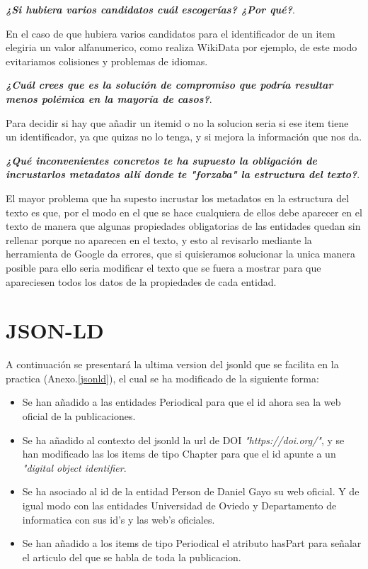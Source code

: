 \documentclass[spanish]{llncs}   %
\begin{document}
\textbf{\textit{¿Si hubiera varios candidatos cuál escogerías? ¿Por qué?}}.

En el caso de que hubiera varios candidatos para el identificador de un item elegiria un valor alfanumerico, como 
realiza WikiData por ejemplo, de este modo evitariamos colisiones y problemas de idiomas.

\textbf{\textit{¿Cuál crees que es la solución de compromiso que podría resultar menos polémica en la mayoría de casos?}}.

Para decidir si hay que añadir un itemid o no la solucion seria si ese item tiene un identificador, ya que quizas no lo tenga,
y si mejora la información que nos da.

\textbf{\textit{¿Qué inconvenientes concretos te ha supuesto la obligación de incrustarlos metadatos allí donde te "forzaba" 
la estructura del texto?}}.

El mayor problema que ha supesto incrustar los metadatos en la estructura del texto es que, por el modo 
en el que se hace cualquiera de ellos debe aparecer en el texto de manera que algunas propiedades obligatorias de las entidades
quedan sin rellenar porque no aparecen en el texto, y esto al revisarlo mediante la herramienta de Google da errores, 
que si quisieramos solucionar la unica manera posible para ello seria modificar el texto que se fuera a mostrar para que 
apareciesen todos los datos de la propiedades de cada entidad.

\section{JSON-LD}

A continuación se presentará la ultima version del jsonld que se facilita en la practica (Anexo.\ref{jsonld}), el cual se ha modificado 
de la siguiente forma:

\begin{itemize}
    \item Se han añadido a las entidades Periodical para que el id ahora sea la web oficial de la publicaciones.
    \item Se ha añadido al contexto del jsonld la url de DOI \textit{"https://doi.org/"}, y se han modificado las
        los items de tipo Chapter para que el id apunte a un \textit{"digital object identifier}.
    \item Se ha asociado al id de la entidad Person de Daniel Gayo su web oficial. Y de igual modo con las entidades 
    Universidad de Oviedo y Departamento de informatica con sus id's y las web's oficiales.
    \item Se han añadido a los items de tipo Periodical el atributo hasPart para señalar el articulo del que se habla de toda 
        la publicacion.
\end{itemize}
\end{document}
